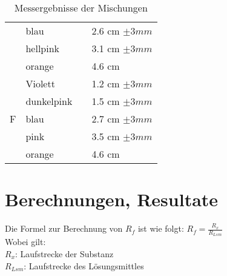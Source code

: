 \documentclass[11pt,paper=a4,final]{scrartcl}
\begin{document}
\begin{savenotes}
\begin{table}[ht!]
\begin{tabular}{|l|l|l|l|}
			& blau		&				& 2.6 cm \(\pm 3 mm \)	\\
      			& hellpink	& 				& 3.1 cm \(\pm 3 mm \)	\\
      			& orange	&				& 4.6 cm		\\ \cline{1-2} \cline{4-4}
      \multirow{5}{*}{F}
			& Violett	&				& 1.2 cm \(\pm 3 mm \)	\\
      			& dunkelpink 	&				& 1.5 cm \(\pm 3 mm \)	\\
      			& blau		& 				& 2.7 cm \(\pm 3 mm \)	\\
      			& pink		&				& 3.5 cm \(\pm 3 mm \)	\\
			& orange	&				& 4.6 cm 		\\ \hline

    \end{tabular}
    \caption{Messergebnisse der Mischungen}
  \end{table}
\end{savenotes}

\section{Berechnungen, Resultate}
Die Formel zur Berechnung von \(R_f\) ist wie folgt: \(R_f = \frac{R_x}{R_{Lsm}} \) \\
Wobei gilt:\\
\(R_x\): Laufstrecke der Substanz\\
\(R_{Lsm}\): Laufstrecke des L\"osungsmittles
\end{document}

